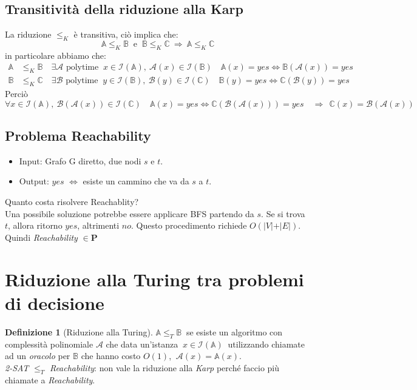 \documentclass[a4paper]{article}
\theoremstyle{definition}
\newtheorem{definit}{Definizione}[subsection]
\newcommand{\p}{\mathbf{P}}
\newcommand{\prob}[1]{\mathbb{#1}}
\newcommand{\instance}[1]{\mathcal{I}(\prob{#1})}
\newcommand{\alg}[1]{\mathcal{#1}}
\begin{document}
	 \subsection{Transitività della riduzione alla Karp}
		 La riduzione $ \leq_K $ è transitiva, ciò implica che:
		 \[
			 \prob{A} \leq_K \prob{B}\ \text{ e }\ \prob{B}\leq_K \prob{C} \ \Rightarrow \ \prob{A}\leq_K \prob{C}
		 \]
		 in particolare abbiamo che:
		 \begin{align*}
			 \prob{A} &\leq_K \prob{B} \quad \exists \alg{A} \text{ polytime } \ x\in \instance{A},\ \alg{A}(x)\in \instance{B}\quad \prob{A}(x) = yes \Leftrightarrow \prob{B}(\alg{A}(x)) = yes \\
			 \prob{B} &\leq_K \prob{C} \quad \exists \alg{B} \text{ polytime } \ y\in \instance{B},\ \alg{B}(y)\in \instance{C}\quad \prob{B}(y) = yes \Leftrightarrow \prob{C}(\alg{B}(y)) = yes
		 \end{align*}
		 Perciò
		 \[
			 \forall x \in \instance{A},\ \alg{B}(\alg{A}(x)) \in \instance{C} \quad \prob{A}(x) = yes \Leftrightarrow
			 \prob{C}(\alg{B}(\alg{A}(x))) = yes \quad \Rightarrow \ \ \prob{C}(x) = \alg{B}(\alg{A}(x))
		 \]

 	\subsection{Problema Reachability}
	 	\begin{itemize}
	 		\item Input: Grafo G diretto, due nodi $ s $ e $ t $.
	 		\item Output: $ yes $ $ \Leftrightarrow $ esiste un cammino che va da $ s $ a $ t $.
	 	\end{itemize}
	 	Quanto costa risolvere Reachablity?\\
	 	Una possibile soluzione potrebbe essere applicare BFS partendo da $ s $. Se si trova $ t $, allora ritorno $ yes $, altrimenti $ no $. Questo procedimento richiede $ O(\vert V\vert+\vert E\vert) $. Quindi \textit{Reachability} $ \in \p $ 
	 	
	 \section{Riduzione alla Turing tra problemi di decisione}
		 \begin{definit}[Riduzione alla Turing]
		 	$ \prob{A}\leq_T \prob{B} \ $ se esiste un algoritmo con complessità polinomiale $ \alg{A} $ che data un'istanza $ \ x \in \instance{A} \ $ utilizzando chiamate ad un \textit{oracolo} per $ \prob{B} $ che hanno costo $ O(1) $, $ \ \alg{A}(x) = \prob{A}(x) $.\\
		 	\textit{2-SAT} $\leq_T$ \textit{Reachability}: non vale la riduzione alla \textit{Karp} perché faccio più chiamate a \textit{Reachability}.
		 \end{definit}
	 
\end{document}
